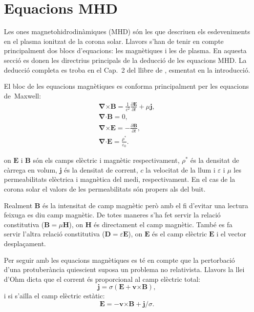 
\chapter{Equacions MHD} \label{sec:equacionsMHD}
Les ones magnetohidrodinàmiques (MHD) són les que descriuen els esdeveniments en el plasma ionitzat de la corona solar.
Llavors s'han de tenir en compte principalment dos blocs d'equacions: les magnètiques i les de plasma.
En aquesta secció es donen les directrius principals de la deducció de les equacions MHD. La deducció completa es troba en el Cap.~2 del llibre de \textcite{Priest_2014}, esmentat en la introducció.

El bloc de les equacions magnètiques es conforma principalment per les equacions de~Maxwell:
\begin{gather}
	\bm{\nabla} \bm{\times} \bm{B} = \frac{1}{c^2} \frac{\partial \bm{E}}{\partial t} + \mu \bm{j}, \tag{2.1} \label{eq.2.1} \\
	\bm{\nabla} \bm{\cdot} \bm{B} = 0, \tag{2.2} \label{eq.2.2} \\
	\bm{\nabla} \bm{\times} \bm{E} = - \frac{\partial \bm{B}}{\partial t}, \tag{2.3} \label{eq.2.3} \\
	\bm{\nabla} \bm{\cdot} \bm{E} = \frac{\rho^*}{\varepsilon_0}. \tag{2.4} \label{eq.2.4}
\end{gather}

on $\bm{E}$ i $\bm{B}$ són els camps elèctric i magnètic respectivament, $\rho^*$ és la densitat de càrrega en volum, $\bm{j}$ és la densitat de corrent, $c$ la velocitat de la llum i $\varepsilon$ i $\mu$ les permeabilitats elèctrica i magnètica del medi, respectivament.
En el cas de la corona solar el valors de les permeabilitats són propers als del buit.

Realment $\bm{B}$ és la intensitat de camp magnètic però amb el fi d'evitar una lectura feixuga es diu camp magnètic.
De totes maneres s'ha fet servir la relació constitutiva ($\bm{B} = \mu \bm{H}$), on $\bm{H}$ és directament el camp magnètic.
També es fa servir l'altra relació constitutiva ($\bm{D} = \varepsilon \bm{E}$), on $\bm{E}$ és el camp elèctric $\bm{E}$ i el vector desplaçament.

Per seguir amb les equacions magnètiques es té en compte que la pertorbació d'una protuberància quiescient suposa un problema no relativista.
Llavors la llei d'Ohm dicta que el corrent és proporcional al camp elèctric total:
\begin{equation}
	\bm{j} =  \sigma (\bm{E} + \bm{v} \bm{\times} \bm{B}), \tag{2.5} \label{eq.2.5}
\end{equation}
i si s'aïlla el camp elèctric estàtic:
\begin{equation}
	\bm{E} = - \bm{v} \bm{\times} \bm{B} + \bm{j}/\sigma. \tag{2.6} \label{eq.2.6}
\end{equation}

